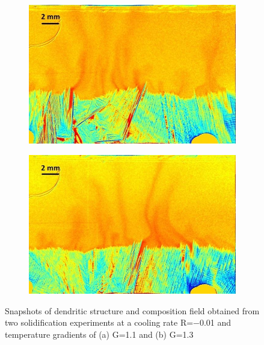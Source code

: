 \begin{figure}[htbp]
\centering
  \begin{subfigure}{0.4\textwidth}
    \centering
	\includegraphics[width=\textwidth]{Chapter3/Graphics/freckle_exp/lowgrad.png}
	\caption{}
    \label{fig:exp_lowgrad}
  \end{subfigure}
  \begin{subfigure}{0.4\textwidth}
    \centering
	\includegraphics[width=\textwidth]{Chapter3/Graphics/freckle_exp/highgrad.png}
	\caption{}
    \label{fig:exp_highgrad}
  \end{subfigure}
\caption{Snapshots of dendritic structure and composition field 
obtained from two solidification experiments at a cooling rate 
R=\SI{-0.01}{\uCR} and temperature gradients of (a) G=\SI{1.1}{\ugradT} and (b) G=\SI{1.3}{\ugradT}} 
\label{fig:experimental_freckles_gradients}
\end{figure}
%
%
